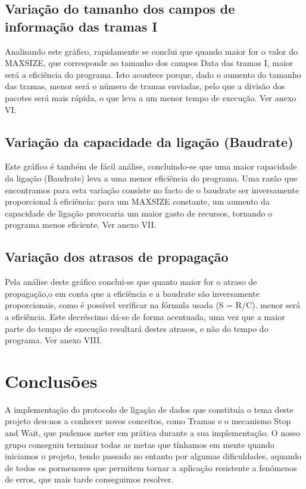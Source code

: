 \documentclass[article, a4paper, 11pt, oneside]{memoir}
\begin{document}
\section{Variação do tamanho dos campos de informação das tramas I}

Analisando este gráfico, rapidamente se conclui que quando maior for o valor do MAX\textunderscore SIZE, que corresponde ao tamanho dos campos Data das tramas I,
maior será a eficiência do programa. Isto acontece porque, dado o aumento do tamanho das tramas, menor será o número de tramas enviadas, pelo que a
divisão dos pacotes será mais rápida, o que leva a um menor tempo de execução. Ver anexo VI.

\section{Variação da capacidade da ligação (Baudrate)}

Este gráfico é também de fácil análise, concluindo-se que uma maior capacidade da ligação (Baudrate) leva a uma menor eficiência do programa.
Uma razão que encontramos para esta variação consiste no facto de o baudrate ser inversamente proporcional à eficiência: para um MAX\textunderscore SIZE constante, um aumento
da capacidade de ligação provocaria um maior gasto de recursos, tornando o programa menos eficiente. Ver anexo VII.

\section{Variação dos atrasos de propagação}

Pela análise deste gráfico conclui-se que quanto maior for o atraso de propagação,o em conta que a eficiência e a baudrate são
inversamente proporcionais, como é possível verificar na fórmula usada (S = R/C). menor será a eficiência. Este decréscimo 
dá-se de forma acentuada, uma vez que a maior parte do tempo de execução resultará destes atrasos, e não do tempo do programa. Ver anexo VIII.

\chapter[Conclusões][Conclusões]{Conclusões} \label{\thechapter}

A implementação do protocolo de ligação de dados que constituía o tema deste projeto deu-nos a conhecer novos conceitos, como Tramas e o mecanismo Stop and Wait, 
que pudemos meter em prática durante a sua implementação. O nosso grupo conseguiu terminar todas as metas que tínhamos em mente quando iniciamos o projeto,
 tendo passado no entanto por algumas dificuldades, aquando de todos os pormenores que permitem tornar a aplicação resistente a fenómenos de erros, que mais tarde conseguimos resolver. 
\end{document}
